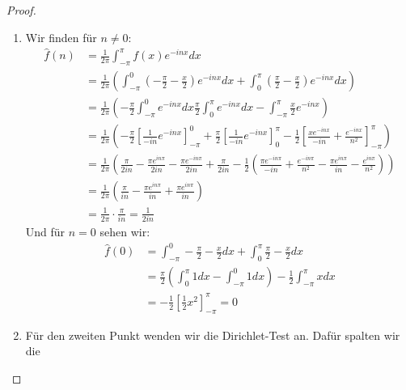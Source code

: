 \documentclass[11pt]{article}
\begin{document}
    \begin{proof}
        \begin{enumerate}[label = (\alph*)]
            \item Wir finden für $n\neq 0$:
            $$\begin{aligned}
                  \hat{f}(n) &= \frac{1}{2\pi}\int_{-\pi}^{\pi}f(x)e^{-inx}dx \\
                  &= \frac{1}{2\pi}\left(\int_{-\pi}^{0}\left(-\frac{\pi}{2}-\frac{x}{2}\right)e^{-inx}dx+
                  \int_{0}^{\pi}\left(\frac{\pi}{2}-\frac{x}{2}\right)e^{-inx}dx\right)\\
                  &= \frac{1}{2\pi}\left(-\frac{\pi}{2}\int_{-\pi}^{0}e^{-inx}dx
                  \frac{\pi}{2}\int_{0}^{\pi}e^{-inx}dx - \int_{-\pi}^{\pi}\frac{x}{2}e^{-inx}\right)\\
                  &= \frac{1}{2\pi}\left(-\frac{\pi}{2}\left[\frac{1}{-in}e^{-inx}\right]_{-\pi}^{0}+
                  \frac{\pi}{2}\left[\frac{1}{-in}e^{-inx}\right]_{0}^{\pi}-\frac{1}{2}\left[
                      \frac{xe^{-inx}}{-in}+\frac{e^{-inx}}{n^2}\right]_{-\pi}^{\pi}\right)\\
                  &= \frac{1}{2\pi}\left(\frac{\pi}{2in}-\frac{\pi e^{in\pi}}{2in}-\frac{\pi e^{-in\pi}}{2in}
                  +\frac{\pi}{2in}-\frac{1}{2}\left(\frac{\pi e^{-in\pi}}{-in}+\frac{e^{-in\pi}}{n^2}-
                  \frac{\pi e^{in\pi}}{in}-\frac{e^{in\pi}}{n^2}\right)\right)\\
                  &= \frac{1}{2\pi}\left(\frac{\pi}{in}-\frac{\pi e^{in\pi}}{in}+\frac{\pi e^{in\pi}}{in}
                  \right)\\
                  &= \frac{1}{2\pi}\cdot \frac{\pi}{in} = \frac{1}{2in}
            \end{aligned}$$
            Und für $n=0$ sehen wir:
            $$\begin{aligned}
                  \hat{f}(0) &= \int_{-\pi}^{0} -\frac{\pi}{2}-\frac{x}{2} dx +
                  \int_{0}^{\pi} \frac{\pi}{2}-\frac{x}{2} dx\\
                  &= \frac{\pi}{2}\left(\int_{0}^{\pi}1 dx-\int_{-\pi}^{0} 1 dx\right) - \frac{1}{2}
                  \int_{-\pi}^{\pi}xdx \\
                  &= -\frac{1}{2}\left[\frac{1}{2}x^2\right]_{-\pi}^{\pi} = 0
            \end{aligned}$$
            \item Für den zweiten Punkt wenden wir die Dirichlet-Test an. Dafür spalten wir die

\end{enumerate}
\end{proof}
\end{document}
